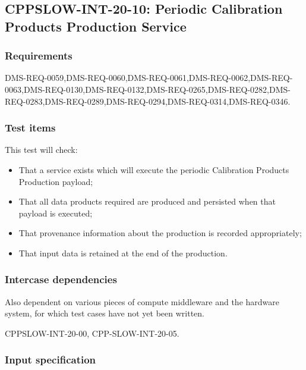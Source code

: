 \subsection{CPPSLOW-INT-20-10: Periodic Calibration Products Production Service}
\label{cppslow-int-20-10}

\subsubsection{Requirements}

DMS-REQ-0059,DMS-REQ-0060,DMS-REQ-0061,DMS-REQ-0062,DMS-REQ-0063,DMS-REQ-0130,DMS-REQ-0132,DMS-REQ-0265,DMS-REQ-0282,DMS-REQ-0283,DMS-REQ-0289,DMS-REQ-0294,DMS-REQ-0314,DMS-REQ-0346.

\subsubsection{Test items}

This test will check:

\begin{itemize}

  \item{That a service exists which will execute the periodic Calibration Products Production payload;}

  \item{That all data products required are produced and persisted when that payload is executed;}

  \item{That provenance information about the production is recorded appropriately;}

  \item{That input data is retained at the end of the production.}

\end{itemize}

\subsubsection{Intercase dependencies}

\begin{note}
  Also dependent on various pieces of compute middleware and the hardware
  system, for which test cases have not yet been written.
\end{note}

CPPSLOW-INT-20-00, CPP-SLOW-INT-20-05.

\subsubsection{Input specification}

